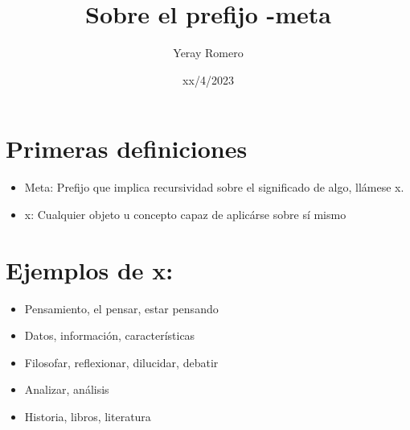 \documentclass{article}
\title{Sobre el prefijo -meta}
\date{xx/4/2023}
\author{Yeray Romero}
\begin{document}
\maketitle

\section{Primeras definiciones}
\begin{itemize}
\item Meta: Prefijo que implica recursividad sobre el significado de algo, llámese x.
\item x: Cualquier objeto u concepto capaz de aplicárse sobre sí mismo
\end{itemize}
\section{Ejemplos de x:}
\begin{itemize}
\item Pensamiento, el pensar, estar pensando
\item Datos, información, características
\item Filosofar, reflexionar, dilucidar, debatir
\item Analizar, análisis
\item Historia, libros, literatura
\end{itemize}
\end{document}
